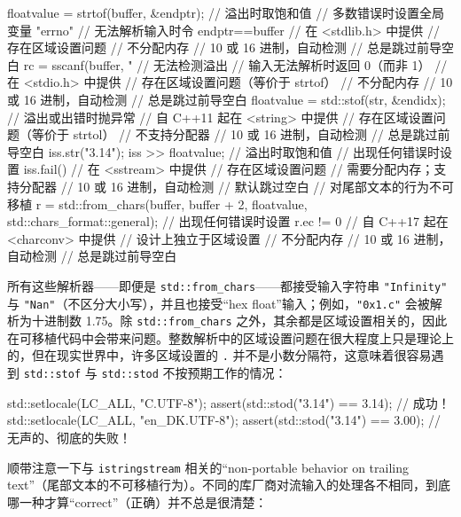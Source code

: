 \begin{codebox}[cpp]
     floatvalue = strtof(buffer, &endptr);
       // 溢出时取饱和值
       // 多数错误时设置全局变量 "errno"
       // 无法解析输入时令 endptr==buffer
       // 在 <stdlib.h> 中提供
       // 存在区域设置问题
       // 不分配内存
       // 10 或 16 进制，自动检测
       // 总是跳过前导空白
     rc = sscanf(buffer, "%
       // 无法检测溢出
       // 输入无法解析时返回 0（而非 1）
       // 在 <stdio.h> 中提供
       // 存在区域设置问题（等价于 strtof）
       // 不分配内存
       // 10 或 16 进制，自动检测
       // 总是跳过前导空白
     floatvalue = std::stof(str, &endidx);
       // 溢出或出错时抛异常
       // 自 C++11 起在 <string> 中提供
       // 存在区域设置问题（等价于 strtol）
       // 不支持分配器
       // 10 或 16 进制，自动检测
       // 总是跳过前导空白
     iss.str("3.14");
     iss >> floatvalue;
       // 溢出时取饱和值
       // 出现任何错误时设置 iss.fail()
       // 在 <sstream> 中提供
       // 存在区域设置问题
       // 需要分配内存；支持分配器
       // 10 或 16 进制，自动检测
       // 默认跳过空白
       // 对尾部文本的行为不可移植
     r = std::from_chars(buffer, buffer + 2, floatvalue,
                         std::chars_format::general);
       // 出现任何错误时设置 r.ec != 0
       // 自 C++17 起在 <charconv> 中提供
       // 设计上独立于区域设置
       // 不分配内存
       // 10 或 16 进制，自动检测
       // 总是跳过前导空白
\end{codebox}

所有这些解析器——即便是 \texttt{std::\allowbreak{}from\_\allowbreak{}chars}——都接受输入字符串 \texttt{"Infinity"} 与 \texttt{"Nan"}（不区分大小写），并且也接受“hex float”输入；例如，\texttt{"0x1.c"} 会被解析为十进制数 1.75。除 \texttt{std::\allowbreak{}from\_\allowbreak{}chars} 之外，其余都是区域设置相关的，因此在可移植代码中会带来问题。整数解析中的区域设置问题在很大程度上只是理论上的，但在现实世界中，许多区域设置的 \texttt{.} 并不是小数分隔符，这意味着很容易遇到 \texttt{std::\allowbreak{}stof} 与 \texttt{std::\allowbreak{}stod} 不按预期工作的情况：

\begin{codebox}[cpp]
     std::setlocale(LC_ALL, "C.UTF-8");
     assert(std::stod("3.14") == 3.14); // 成功！
     std::setlocale(LC_ALL, "en_DK.UTF-8");
     assert(std::stod("3.14") == 3.00); // 无声的、彻底的失败！
\end{codebox}

顺带注意一下与 \texttt{istringstream} 相关的“non-portable behavior on trailing text”（尾部文本的不可移植行为）。不同的库厂商对流输入的处理各不相同，到底哪一种才算“correct”（正确）并不总是很清楚：

